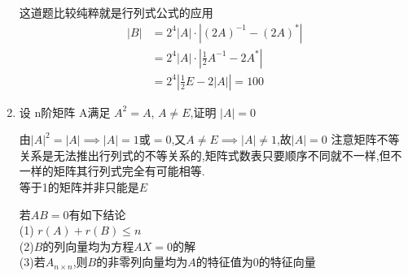 \documentclass[12pt, a4paper, oneside, UTF8]{ctexbook}
\begin{document}
\begin{enumerate}[label=\arabic*.,start=7]
    \begin{solution}
    这道题比较纯粹就是行列式公式的应用
    \begin{align*}
        \left|B\right| &= 2^4\left|A\right|\cdot\left|(2A)^{-1}-(2A)^{*}\right| \\
        &= 2^4\left|A\right|\cdot\left|\frac{1}{2}A^{-1}-2A^{*}\right| \\
        &= 2^4\left|\frac{1}{2}E-2|A|\right| = 100
    \end{align*}
    \end{solution}

    \item  设 n阶矩阵 A满足 $A^2=A$, $A\neq E$,证明 $|A|=0$
    \begin{tcolorbox}[title=易错点]
        由$|A|^2=|A|\implies |A|=1\text{或}=0$,又$A\neq E\implies |A|\neq 1$,故$|A| = 0$
        注意矩阵不等关系是无法推出行列式的不等关系的,矩阵式数表只要顺序不同就不一样,但不一样的矩阵其行列式完全有可能相等.\\
        等于1的矩阵并非只能是$E$
    \end{tcolorbox}
    \begin{tcolorbox}[title=总结]
    若$AB=0$有如下结论 \\
    (1) $r(A)+r(B)\leq n$ \\
    (2)$B$的列向量均为方程$AX=0$的解 \\
    (3)若$A_{n\times n}$,则$B$的非零列向量均为$A$的特征值为$0$的特征向量
    \end{tcolorbox}
\end{enumerate}

\ifx\allfiles\undefined
\end{document}
